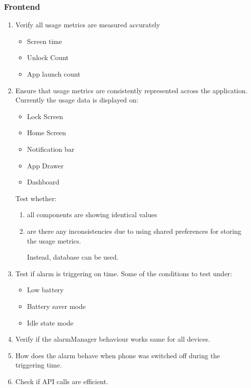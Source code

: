 \documentclass{article}
\begin{document}
\subsubsection{Frontend}
\begin{enumerate}
    \item Verify all usage metrics are measured accurately
    \begin{itemize}
        \item Screen time
        \item Unlock Count
        \item App launch count
    \end{itemize}
    \item Ensure that usage metrics are consistently represented across the application.
    Currently the usage data is displayed on: 
    \begin{itemize}
        \item Lock Screen
        \item Home Screen
        \item Notification bar
        \item App Drawer
        \item Dashboard
    \end{itemize}
    Test whether: 
    \begin{enumerate}
        \item all components are showing identical values 
        \item are there any inconsistencies due to using shared preferences for storing the usage metrics. 

        Instead, database can be used.
    \end{enumerate}

    \item Test if alarm is triggering on time. Some of the conditions to test under: 
    \begin{itemize}
        \item Low battery
        \item Battery saver mode
        \item Idle state mode
    \end{itemize}

    \item Verify if the alarmManager behaviour works same for all devices. 

    \item How does the alarm behave when phone was switched off during the triggering time.

    \item Check if API calls are efficient.
\end{enumerate}
\end{document}
